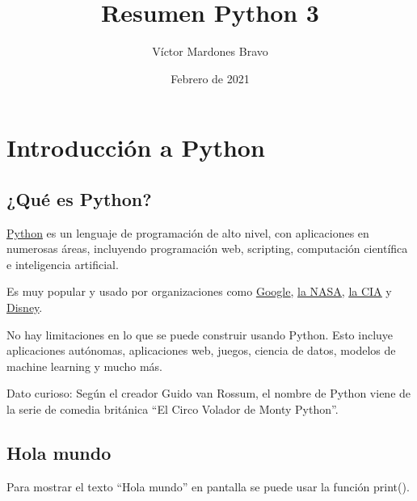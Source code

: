 \documentclass{report}
\title{Resumen Python 3}
\author{Víctor Mardones Bravo}
\date{Febrero de 2021}
\newcommand{\doble}[1]{``#1''}
\begin{document}

\null
\nointerlineskip
\vfill
\let\snewpage \newpage
\let\newpage \relax
  {\centering\def\svgwidth{\columnwidth}
  }
\maketitle
\let \newpage \snewpage
\vfill 
\break

\clearpage

\tableofcontents

\clearpage


\chapter{Introducción a Python}

\section{¿Qué es Python?}

\href{https://www.python.org}{\underline{Python}} es un lenguaje de programación de alto nivel, con aplicaciones en numerosas áreas, incluyendo programación web, scripting, computación científica e inteligencia artificial.

Es muy popular y usado por organizaciones como \href{https://www.google.com}{\underline{Google}}, \href{https://www.nasa.gov}{\underline{la NASA}}, \href{https://www.cia.gov}{\underline{la CIA}} y \href{https://www.disney.com}{\underline{Disney}}.

No hay limitaciones en lo que se puede construir usando Python. Esto incluye aplicaciones autónomas, aplicaciones web, juegos, ciencia de datos, modelos de machine learning y mucho más.

Dato curioso: Según el creador Guido van Rossum, el nombre de Python viene de la serie de comedia británica \doble{El Circo Volador de Monty Python}.

\section{Hola mundo}

Para mostrar el texto \doble{Hola mundo} en pantalla se puede usar la función print().
\end{document}
